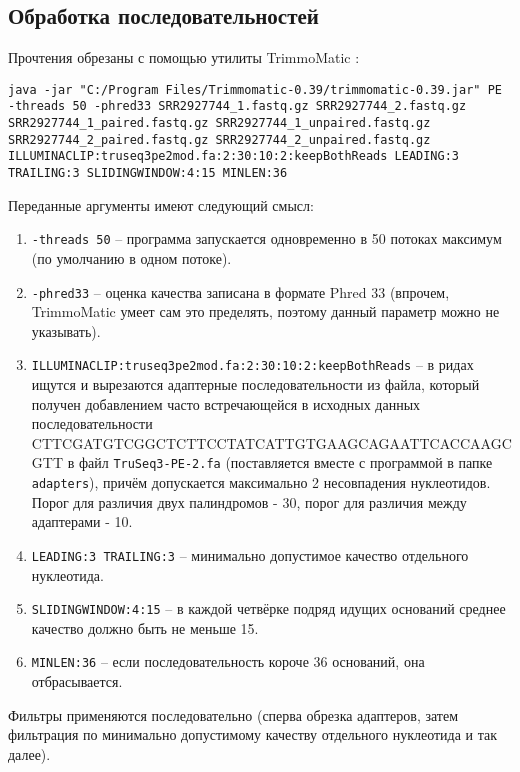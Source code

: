 \documentclass[a4paper,12pt]{article}
\begin{document}
\subsection{Обработка последовательностей}

Прочтения обрезаны с помощью утилиты TrimmoMatic \cite{bogler}:

\begin{lstlisting}
java -jar "C:/Program Files/Trimmomatic-0.39/trimmomatic-0.39.jar" PE -threads 50 -phred33 SRR2927744_1.fastq.gz SRR2927744_2.fastq.gz SRR2927744_1_paired.fastq.gz SRR2927744_1_unpaired.fastq.gz SRR2927744_2_paired.fastq.gz SRR2927744_2_unpaired.fastq.gz  ILLUMINACLIP:truseq3pe2mod.fa:2:30:10:2:keepBothReads LEADING:3 TRAILING:3 SLIDINGWINDOW:4:15 MINLEN:36
\end{lstlisting}

Переданные аргументы имеют следующий смысл:
\begin{enumerate}[noitemsep]
    \item \texttt{-threads 50} -- программа запускается одновременно в 50 потоках максимум (по умолчанию в одном потоке).
    \item \texttt{-phred33} -- оценка качества записана в формате Phred 33 (впрочем, Trim\-mo\-Matic умеет сам это пределять, поэтому данный параметр можно не указывать).
    \item \texttt{ILLUMINACLIP:truseq3pe2mod.fa:2:30:10:2:keepBothReads} -- в ридах ищутся и вырезаются адаптерные последовательности из файла, который получен добавлением часто встречающейся в исходных данных последовательности CTTC\-GATG\-TCGG\-CTCT\-TCCT\-ATCA\-TTGT\-GAAG\-CAGAA\-TTCAC\-CAAG\-CGTT в файл \texttt{Tru\-Seq3-\-PE-2.fa} (поставляется вместе с программой в папке \texttt{adapters}), причём допускается максимально 2 несовпадения нуклеотидов.
    Порог для различия двух палиндромов - 30, порог для различия между адаптерами - 10.
    \item \texttt{LEADING:3 TRAILING:3} -- минимально допустимое качество отдельного нуклеотида.
    \item \texttt{SLIDINGWINDOW:4:15} -- в каждой четвёрке подряд идущих оснований среднее качество должно быть не меньше 15.
    \item \texttt{MINLEN:36} -- если последовательность короче 36 оснований, она отбрасывается.
\end{enumerate}

Фильтры применяются последовательно (сперва обрезка адаптеров, затем фильтрация по минимально допустимому качеству отдельного нуклеотида и так далее).
\end{document}
